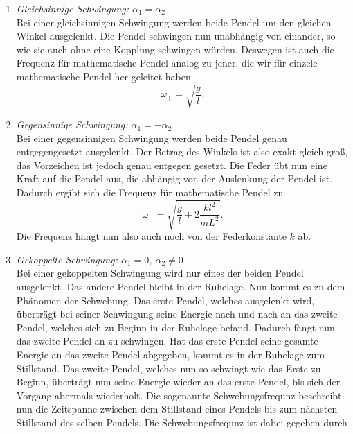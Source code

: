 \begin{enumerate}
  \item \textit{Gleichsinnige Schwingung: $\alpha_1=\alpha_2$} \\
        Bei einer gleichsinnigen Schwingung werden beide Pendel um den gleichen Winkel ausgelenkt. Die Pendel schwingen nun unabhängig von einander,
        so wie sie auch ohne eine Kopplung schwingen würden. Deswegen ist auch die Frequenz für mathematische Pendel analog zu jener, die wir für einzele
        mathematische Pendel her geleitet haben
        \begin{equation}
          \omega_{+}=\sqrt{\frac{g}{l}}.
        \end{equation}
  \item \textit{Gegensinnige Schwingung: $\alpha_1=-\alpha_2$}\\
        Bei einer gegensinnigen Schwingung werden beide Pendel genau entgegengesetzt ausgelenkt. Der Betrag des Winkels ist also exakt gleich groß, das Vorzeichen
        ist jedoch genau entgegen gesetzt. Die Feder übt nun eine Kraft auf die Pendel aus, die abhängig von der Auslenkung der Pendel ist. Dadurch ergibt sich die
        Frequenz für mathematische Pendel zu
        \begin{equation}
          \omega_{-}=\sqrt{\frac{g}{l}+2\frac{kl^2}{mL^2}}.
        \end{equation}
        Die Frequenz hängt nun also auch noch von der Federkonstante $k$ ab.
  \item \textit{Gekoppelte Schwingung: $\alpha_1=0$, $\alpha_2\neq 0$}\\
        Bei einer gekoppelten Schwingung wird nur eines der beiden Pendel ausgelenkt. Das andere Pendel bleibt in der Ruhelage. Nun kommt es zu dem Phänomen der
        Schwebung. Das erste Pendel, welches ausgelenkt wird, überträgt bei seiner Schwingung seine Energie nach und nach an das zweite Pendel, welches sich
        zu Beginn in der Ruhelage befand. Dadurch fängt nun das zweite Pendel an zu schwingen. Hat das erste Pendel seine gesamte Energie an das zweite Pendel
        abgegeben, kommt es in der Ruhelage zum Stillstand. Das zweite Pendel, welches nun so schwingt wie das Erste zu Beginn, überträgt nun seine Energie wieder
        an das erste Pendel, bis sich der Vorgang abermals wiederholt. Die sogenannte Schwebungsfrequnz beschreibt nun die Zeitspanne zwischen dem Stillstand eines
        Pendels bis zum nächsten Stillstand des selben Pendels. Die Schwebungsfrequnz ist dabei gegeben durch
        \begin{equation}

\end{equation}
\end{enumerate}
